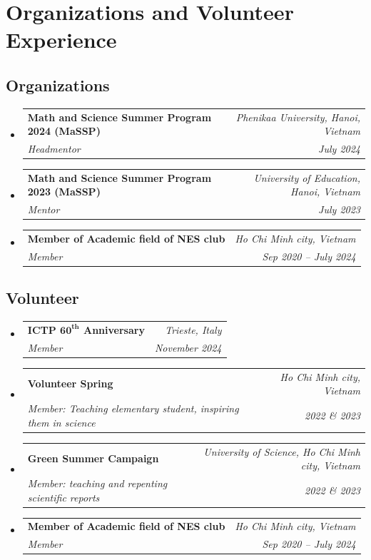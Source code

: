 \documentclass[letterpaper,11pt]{article}
\makeatletter
\newcommand{\resumeOrganizationHeading}[4]{
	\vspace{-2pt}\item
	\begin{tabular*}{0.97\textwidth}[t]{l@{\extracolsep{\fill}}r}
		\textbf{#1} & \textit{\small #2} \\
		\textit{\small#3} & \textit{\small #4} 
	\end{tabular*}\vspace{-7pt}
}
\newcommand{\resumeSubHeadingListStart}{\begin{itemize}[leftmargin=0.15in, label={}]}
\newcommand{\resumeSubHeadingListEnd}{\end{itemize}}
\makeatother
\begin{document}
	
	
	
	
	
	
	
	
	
	
	 \section{Organizations and Volunteer Experience}
\subsection*{Organizations}
\resumeSubHeadingListStart
\resumeOrganizationHeading{Math and Science Summer Program 2024 (MaSSP)}{Phenikaa University, Hanoi, Vietnam}{Headmentor}{July 2024}
\resumeOrganizationHeading{Math and Science Summer Program 2023 (MaSSP)}{University of Education, Hanoi, Vietnam}{Mentor}{July 2023}
\resumeOrganizationHeading
{Member of Academic field of NES club}{Ho Chi Minh city, Vietnam}{Member}{Sep 2020 -- July 2024}
\resumeSubHeadingListEnd
\subsection*{Volunteer}
\resumeSubHeadingListStart
\resumeOrganizationHeading{ICTP \(\textbf{60}^{\textbf{th}}\) Anniversary}{Trieste, Italy}{Member}{November 2024}
\resumeOrganizationHeading{Volunteer Spring}{Ho Chi Minh city, Vietnam}{Member: Teaching elementary student, inspiring them in science}{2022 \& 2023}
\resumeOrganizationHeading{Green Summer Campaign}{University of Science, Ho Chi Minh city, Vietnam}{Member: teaching and repenting scientific reports}{2022 \& 2023}
\resumeOrganizationHeading
{Member of Academic field of NES club}{Ho Chi Minh city, Vietnam}{Member}{Sep 2020 -- July 2024}
\resumeSubHeadingListEnd
	
\end{document}
